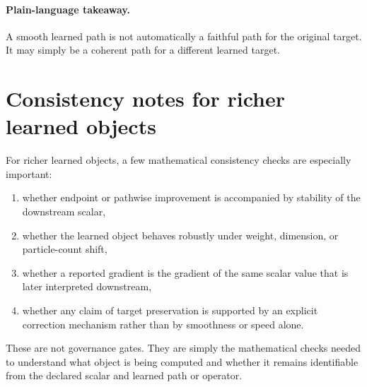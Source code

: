 \paragraph{Plain-language takeaway.}
A smooth learned path is not automatically a faithful path for the original target.
It may simply be a coherent path for a different learned target.

\section{Consistency notes for richer learned objects}
\label{sec:bf-neural-ot-dynamic-promotion}

For richer learned objects, a few mathematical consistency checks are especially
important:
\begin{enumerate}[label=(\roman*)]
  \item whether endpoint or pathwise improvement is accompanied by stability of the
  downstream scalar,
  \item whether the learned object behaves robustly under weight, dimension, or
  particle-count shift,
  \item whether a reported gradient is the gradient of the same scalar value that
  is later interpreted downstream,
  \item whether any claim of target preservation is supported by an explicit
  correction mechanism rather than by smoothness or speed alone.
\end{enumerate}
These are not governance gates.  They are simply the mathematical checks needed to
understand what object is being computed and whether it remains identifiable from
the declared scalar and learned path or operator.

